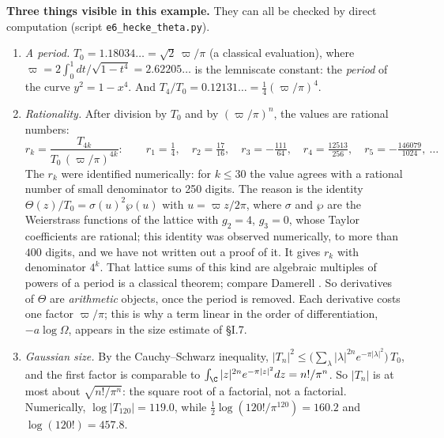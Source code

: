 \documentclass[11pt,letterpaper]{article}
\begin{document}
\textbf{Three things visible in this example.} They can all be checked by direct computation (script
\texttt{e6\_hecke\_theta.py}).
\begin{enumerate}[leftmargin=2em]
\item \emph{A period.} $T_0=1.18034\ldots=\sqrt2\,\varpi/\pi$ (a classical evaluation), where
$\varpi=2\int_0^1dt/\sqrt{1-t^4}=2.62205\ldots$ is the lemniscate constant: the \emph{period} of the curve
$y^2=1-x^4$. And $T_4/T_0=0.12131\ldots=\frac14(\varpi/\pi)^4$.
\item \emph{Rationality.} After division by $T_0$ and by $(\varpi/\pi)^n$, the values are rational numbers:
\begin{equation}\label{D:14}
 r_k=\frac{T_{4k}}{T_0\,(\varpi/\pi)^{4k}}:\qquad
 r_1=\tfrac14,\quad r_2=\tfrac{17}{16},\quad r_3=-\tfrac{111}{64},\quad r_4=\tfrac{12513}{256},
 \quad r_5=-\tfrac{146079}{1024},\ \ldots
\end{equation}
The $r_k$ were identified numerically: for $k\le30$ the value agrees with a rational number of small
denominator to 250 digits. The reason is the identity $\Theta(z)/T_0=\sigma(u)^2\wp(u)$
with $u=\varpi z/2\pi$, where $\sigma$ and $\wp$ are the Weierstrass functions of the lattice with $g_2=4$,
$g_3=0$, whose Taylor coefficients are rational; this identity was observed numerically, to more than $400$
digits, and we have not written out a proof of it. It gives $r_k$ with denominator $4^k$. That lattice sums of
this kind are algebraic multiples of powers of a period is a classical theorem; compare Damerell
\cite{Dam70}. So derivatives of $\Theta$ are \emph{arithmetic} objects, once the period is removed. Each derivative costs one factor $\varpi/\pi$; this is why a term linear in the order
of differentiation, $-a\log\Omega$, appears in the size estimate of \S I.7.
\item \emph{Gaussian size.} By the Cauchy--Schwarz inequality,
$|T_n|^2\le\big(\sum_\lambda|\lambda|^{2n}e^{-\pi|\lambda|^2}\big)\,T_0$, and the first factor is comparable
to $\int_{\C}|z|^{2n}e^{-\pi|z|^2}dz=n!/\pi^n$. So $|T_n|$ is at most about $\sqrt{n!/\pi^n}$: the square root
of a factorial, not a factorial. Numerically, $\log|T_{120}|=119.0$, while
$\tfrac12\log(120!/\pi^{120})=160.2$ and $\log(120!)=457.8$.
\end{enumerate}
\end{document}
